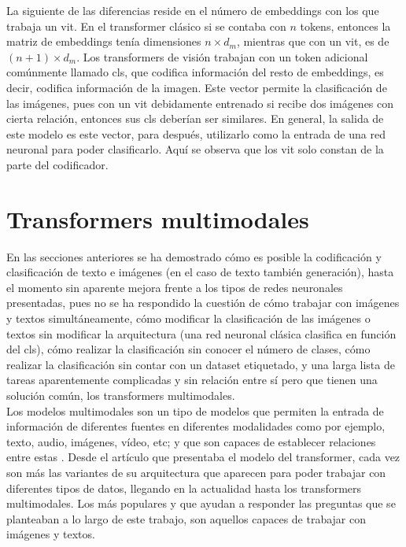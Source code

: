 			La siguiente de las diferencias reside en el número de embeddings con los que trabaja un \gls{vit}. En el transformer clásico si se contaba con $n$ tokens, entonces la matriz de embeddings tenía dimensiones $n \times d_m$, mientras que con un \gls{vit}, es de $(n + 1) \times d_m$. Los transformers de visión trabajan con un token adicional comúnmente llamado \gls{cls}, que codifica información del resto de embeddings, es decir, codifica información de la imagen. Este vector permite la clasificación de las imágenes, pues con un \gls{vit} debidamente entrenado si recibe dos imágenes con cierta relación, entonces sus \gls{cls} deberían ser similares. En general, la salida de este modelo es este vector, para después, utilizarlo como la entrada de una red neuronal para poder clasificarlo. Aquí se observa que los \gls{vit} solo constan de la parte del codificador. 
			
		\section{Transformers multimodales}\label{sec:transformers_multimodales}
		
			En las secciones anteriores se ha demostrado cómo es posible la codificación y clasificación de texto e imágenes (en el caso de texto también generación), hasta el momento sin aparente mejora frente a los tipos de redes neuronales presentadas, pues no se ha respondido la cuestión de cómo trabajar con imágenes y textos simultáneamente, cómo modificar la clasificación de las imágenes o textos sin modificar la arquitectura (una red neuronal clásica clasifica en función del \gls{cls}), cómo realizar la clasificación sin conocer el número de clases, cómo realizar la clasificación sin contar con un dataset etiquetado, y una larga lista de tareas aparentemente complicadas y sin relación entre sí pero que tienen una solución común, los transformers multimodales. \\
			
			Los modelos multimodales son un tipo de modelos que permiten la entrada de información de diferentes fuentes en diferentes modalidades como por ejemplo, texto, audio, imágenes, vídeo, etc; y que son capaces de establecer relaciones entre estas \cite{multimodal_dl}. Desde el artículo que presentaba el modelo del transformer, cada vez son más las variantes de su arquitectura que aparecen para poder trabajar con diferentes tipos de datos, llegando en la actualidad hasta los transformers multimodales. Los más populares y que ayudan a responder las preguntas que se planteaban a lo largo de este trabajo, son aquellos capaces de trabajar con imágenes y textos. \\
			
